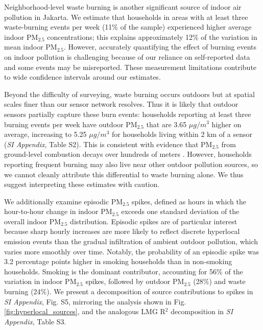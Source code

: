 \documentclass[9pt,twocolumn,twoside]{pnas-new}
\begin{document}
Neighborhood-level waste burning is another significant source of indoor air pollution in Jakarta. We estimate that households in areas with at least three waste-burning events per week (11\% of the sample) experienced higher average indoor PM$_{2.5}$ concentrations; this explains approximately 12\% of the variation in mean indoor PM$_{2.5}$. However, accurately quantifying the effect of burning events on indoor pollution is challenging because of our reliance on self-reported data and some events may be misreported. These measurement limitations contribute to wide confidence intervals around our estimates.

Beyond the difficulty of surveying, waste burning occurs outdoors but at spatial scales finer than our sensor network resolves. Thus it is likely that outdoor sensors partially capture these burn events: households reporting at least three burning events per week have outdoor PM$_{2.5}$ that are 3.65 $\mu g/m^3$ higher on average, increasing to 5.25 $\mu g/m^3$ for households living within 2 km of a sensor (\textit{SI Appendix}, Table S2). This is consistent with evidence that PM$_{2.5}$ from ground-level combustion decays over hundreds of meters \citep{WHO2013REVIHAAP}. However, households reporting frequent burning may also live near other outdoor pollution sources, so we cannot cleanly attribute this differential to waste burning alone. We thus suggest interpreting these estimates with caution.


We additionally examine episodic PM$_{2.5}$ spikes, defined as hours in which the hour-to-hour change in indoor PM$_{2.5}$ exceeds one standard deviation of the overall indoor PM$_{2.5}$ distribution. Episodic spikes are of particular interest because sharp hourly increases are more likely to reflect discrete hyperlocal emission events than the gradual infiltration of ambient outdoor pollution, which varies more smoothly over time. Notably, the probability of an episodic spike was 3.2 percentage points higher in smoking households than in non-smoking households. Smoking is the dominant contributor, accounting for 56\% of the variation in indoor PM$_{2.5}$ spikes, followed by outdoor PM$_{2.5}$ (28\%) and waste burning (24\%). We present a decomposition of source contributions to spikes in \textit{SI Appendix}, Fig. S5, mirroring the analysis shown in Fig. \ref{fig:hyperlocal_sources}, and the analogous LMG R$^2$ decomposition in \textit{SI Appendix}, Table S3.
\end{document}
